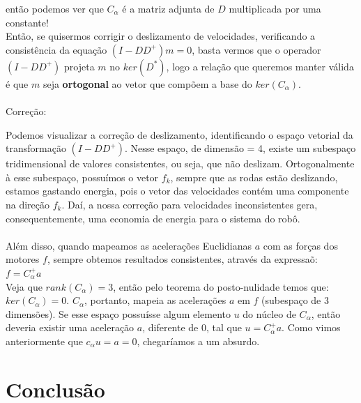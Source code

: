 \documentclass{article}
\begin{document}
então podemos ver que $C_{\alpha}$ é a matriz adjunta de $D$ multiplicada por uma constante!
\\ Então, se quisermos corrigir o deslizamento de velocidades, verificando a consistência da equação $(I-DD^+)m = 0$, basta vermos que o operador $(I - DD^+)$ projeta $m$ no $ker(D^*)$,
logo a relação que queremos manter válida é que $m$ seja \textbf{ortogonal} ao vetor que compõem a base do $ker(C_{\alpha})$.
\\ \\ Correção:

Podemos visualizar a correção de deslizamento, identificando o espaço vetorial da transformação $(I - DD^+)$.
Nesse espaço, de dimensão = 4, existe um subespaço tridimensional de valores consistentes, ou seja, que não deslizam. Ortogonalmente à esse subespaço,
possuímos o vetor $f_{k}$, sempre que as rodas estão deslizando, estamos gastando energia, pois o vetor das velocidades contém uma componente na direção $f_{k}$.
Daí, a nossa correção para velocidades inconsistentes gera, consequentemente, uma economia de energia para o sistema do robô.
\\ \\ Além disso, quando mapeamos as acelerações Euclidianas $a$ com as forças dos motores $f$, sempre obtemos resultados consistentes, através da expressaõ:
\\ $f = C_{\alpha}^+a$
\\ Veja que $rank(C_{\alpha}) = 3$, então pelo teorema do posto-nulidade temos que: $ker(C_{\alpha}) = 0$. $C_{\alpha}$, portanto, mapeia as acelerações $a$  em $f$ (subespaço de 3 dimensões).
Se esse espaço possuísse algum elemento $u$ do núcleo de $C_{\alpha}$, então deveria existir uma aceleração $a$, diferente de 0, tal que $u = C_{\alpha}^+a$. Como vimos anteriormente que $c_ {\alpha}u = a = 0$, chegaríamos a um absurdo.

\section{Conclusão}
\end{document}
